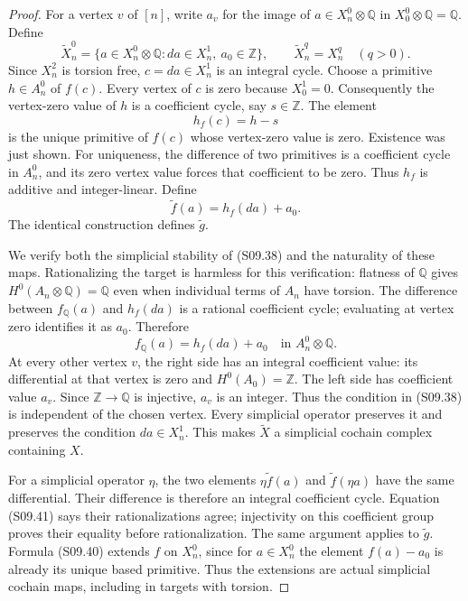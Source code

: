 \begin{proof}
For a vertex $v$ of $[n]$, write $a_v$ for the image
of $a\in X_n^0\otimes\mathbb Q$ in
$X_0^0\otimes\mathbb Q=\mathbb Q$.
Define
\[
 \widetilde X_n^0=
 \{a\in X_n^0\otimes\mathbb Q:
                  da\in X_n^1,\ a_0\in\mathbb Z\},
 \qquad
 \widetilde X_n^q=X_n^q\quad(q>0).
 \tag{S09.38}
\]
Since $X_n^2$ is torsion free, $c=da\in X_n^1$ is
an integral cycle.  Choose a primitive $h\in A_n^0$
of $f(c)$.  Every vertex of $c$ is zero because
$X_0^1=0$.  Consequently the vertex-zero value of
$h$ is a coefficient cycle, say $s\in\mathbb Z$.
The element
\[
                h_f(c)=h-s
 \tag{S09.39}
\]
is the unique primitive of $f(c)$ whose vertex-zero
value is zero.  Existence was just shown.  For
uniqueness, the difference of two primitives is a
coefficient cycle in $A_n^0$, and its zero vertex
value forces that coefficient to be zero.  Thus
$h_f$ is additive and integer-linear.  Define
\[
                 \widetilde f(a)=h_f(da)+a_0.
 \tag{S09.40}
\]
The identical construction defines $\widetilde g$.

We verify both the simplicial stability of (S09.38)
and the naturality of these maps.  Rationalizing the
target is harmless for this verification: flatness
of $\mathbb Q$ gives $H^0(A_n\otimes\mathbb Q)=\mathbb Q$
even when individual terms of $A_n$ have torsion.
The difference between $f_{\mathbb Q}(a)$ and
$h_f(da)$ is a rational coefficient cycle; evaluating
at vertex zero identifies it as $a_0$.  Therefore
\[
            f_{\mathbb Q}(a)=h_f(da)+a_0
                      \quad\text{in }A_n^0\otimes\mathbb Q.
 \tag{S09.41}
\]
At every other vertex $v$, the right side has an
integral coefficient value: its differential at that
vertex is zero and $H^0(A_0)=\mathbb Z$.
The left side has coefficient value $a_v$.
Since $\mathbb Z\to\mathbb Q$ is injective, $a_v$ is
an integer.  Thus the condition in (S09.38) is
independent of the chosen vertex.  Every simplicial
operator preserves it and preserves the condition
$da\in X_n^1$.  This makes $\widetilde X$ a
simplicial cochain complex containing $X$.

For a simplicial operator $\eta$, the two elements
$\eta\widetilde f(a)$ and $\widetilde f(\eta a)$
have the same differential.  Their difference is
therefore an integral coefficient cycle.  Equation
(S09.41) says their rationalizations agree; injectivity
on this coefficient group proves their equality
before rationalization.  The same argument applies
to $\widetilde g$.  Formula (S09.40) extends $f$ on
$X_n^0$, since for $a\in X_n^0$ the element
$f(a)-a_0$ is already its unique based primitive.
Thus the extensions are actual simplicial cochain
maps, including in targets with torsion.


\end{proof}
